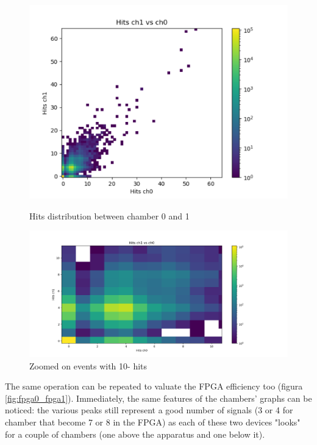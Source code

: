 \documentclass[a4paper,11pt]{book}
\begin{document}
\begin{figure}[!hbtp]
\begin{minipage}[c]{0.5\textwidth}
\centering
\includegraphics[scale=0.5]{pictures/Hits_ch1_vs_ch0.pdf}
\caption{Hits distribution between chamber 0 and 1}
\label{fig:ch1_ch0}
\end{minipage}  
\begin{minipage}[c]{0.5\textwidth}
\centering
\includegraphics[scale=0.3]{pictures/Hits_ch1_vs_ch0_zoom.pdf}
\caption{Zoomed on events with 10- hits}
\label{fig:ch1_ch0_zoom}
\end{minipage}
\end{figure}

The same operation can be repeated to valuate the FPGA efficiency too (figura \ref{fig:fpga0_fpga1}). Immediately, the same features of the chambers' graphs can be noticed: the various peaks still represent a good number of signals (3 or 4 for chamber that become 7 or 8 in the FPGA) as each of these two devices "looks" for a couple of chambers (one above the apparatus and one below it).\\
\end{document}
